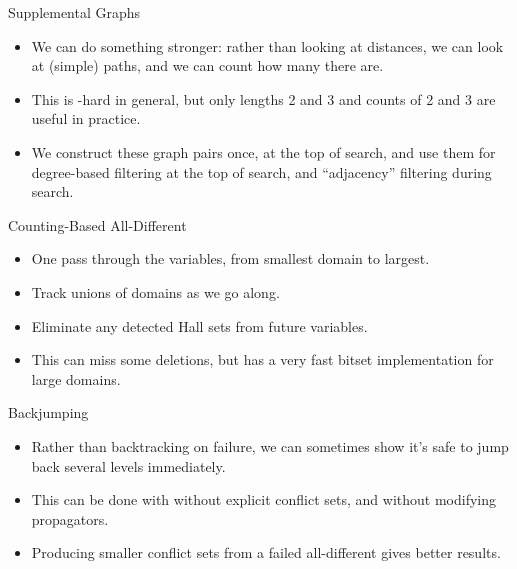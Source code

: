 \documentclass{beamer}
\begin{document}
\begin{frame}{Supplemental Graphs}
{
        \vspace{1em}
    }

     {
        \begin{itemize}
            \item We can do something stronger: rather than looking at distances, we can look at
                \textcolor{uofgthistle}{(simple) paths}, and we can count how many there are.

            \item This is \NP-hard in general, but only \textcolor{uofgthistle}{lengths 2 and 3} and
                counts of 2 and 3 are useful in practice.

            \item We construct these graph pairs \textcolor{uofgthistle}{once, at the top of
                search}, and use them for degree-based filtering at the top of search, and
                ``adjacency'' filtering during search.
        \end{itemize}
    }
\end{frame}

\begin{frame}{Counting-Based All-Different}
    \begin{itemize}
        \item \textcolor{uofgthistle}{One pass} through the variables, from smallest domain to largest.

        \item Track \textcolor{uofgthistle}{unions of domains} as we go along.

        \item Eliminate \textcolor{uofgthistle}{any detected Hall sets} from future variables.

        \item This \textcolor{uofgthistle}{can miss some deletions}, but has a very fast bitset
            implementation for large domains.
    \end{itemize}
\end{frame}

\begin{frame}{Backjumping}
    \begin{itemize}
        \item Rather than backtracking on failure, we can sometimes show it's safe to jump back
            several levels immediately.
        \item This can be done with without explicit conflict sets, and without modifying
            propagators.
        \item Producing smaller conflict sets from a failed all-different gives better results.
    \end{itemize}
\end{frame}
\end{document}
